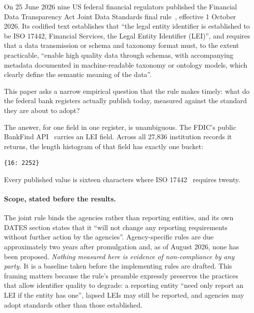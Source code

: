 \documentclass[11pt]{article}
\begin{document}
On 25 June 2026 nine US federal financial regulators published the Financial Data Transparency Act Joint Data Standards final rule~\cite{fdta2026}, effective 1 October 2026. Its codified text establishes that ``the legal entity identifier is established to be ISO 17442, Financial Services, the Legal Entity Identifier (LEI)'', and requires that a data transmission or schema and taxonomy format must, to the extent practicable, ``enable high quality data through schemas, with accompanying metadata documented in machine-readable taxonomy or ontology models, which clearly define the semantic meaning of the data''.

This paper asks a narrow empirical question that the rule makes timely: what do the federal bank registers actually publish today, measured against the standard they are about to adopt?

The answer, for one field in one register, is unambiguous. The FDIC's public BankFind API~\cite{bankfind} carries an LEI field. Across all 27,836 institution records it returns, the length histogram of that field has exactly one bucket:

\begin{lstlisting}
{16: 2252}
\end{lstlisting}

\noindent Every published value is sixteen characters where ISO 17442~\cite{iso17442} requires twenty.

\paragraph{Scope, stated before the results.}
The joint rule binds the agencies rather than reporting entities, and its own DATES section states that it ``will not change any reporting requirements without further action by the agencies''. Agency-specific rules are due approximately two years after promulgation and, as of August 2026, none has been proposed. \emph{Nothing measured here is evidence of non-compliance by any party.} It is a baseline taken before the implementing rules are drafted. This framing matters because the rule's preamble expressly preserves the practices that allow identifier quality to degrade: a reporting entity ``need only report an LEI if the entity has one'', lapsed LEIs may still be reported, and agencies may adopt standards other than those established.
\end{document}
